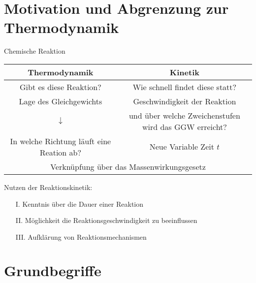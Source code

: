 \documentclass[a4paper, fleqn]{article}
\begin{document}
\tableofcontents
\newpage
\section{Motivation und Abgrenzung zur Thermodynamik}
\begin{center}
    Chemische Reaktion\\
    \begin{tabular}{c c}
        Thermodynamik&Kinetik\\
        \hline
        Gibt es diese Reaktion? & Wie schnell findet diese statt?\\
        Lage des Gleichgewichts & Geschwindigkeit der Reaktion\\
        $\downarrow$ & und über welche Zweichenstufen wird das GGW erreicht?\\
        In welche Richtung läuft eine Reation ab? & Neue Variable Zeit $t$\\
        \multicolumn{2}{c}{Verknüpfung über das Massenwirkungsgesetz}\\
    \end{tabular}
\end{center}
Nutzen der Reaktionskinetik:
\begin{itemize}
    \item[I.] Kenntnis über die Dauer einer Reaktion
    \item[II.] Möglichkeit die Reaktionsgeschwindigkeit zu beeinflussen
    \item[III.] Aufklärung von Reaktionsmechanismen 
\end{itemize}

\section{Grundbegriffe}
\end{document}
